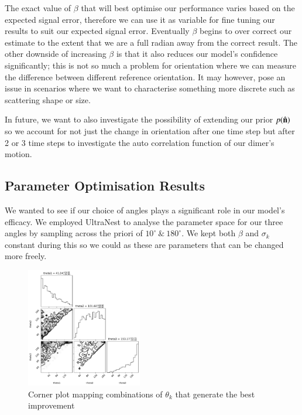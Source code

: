 \documentclass[final,  3p]{elsarticle}
\begin{document}
The exact value of $\beta$ that will best optimise our performance varies based on the expected signal error, therefore we can use it as variable for fine tuning our results to suit our expected signal error. Eventually $\beta$ begins to over correct our estimate to the extent that we are a full radian away from the correct result. The other downside of increasing $\beta$ is that it also reduces our model's confidence significantly; this is not so much a problem for orientation where we can measure the difference between different reference orientation. It may however, pose an issue in scenarios where we want to characterise something more discrete such as scattering shape or size. 

In future, we want to also investigate the possibility of extending our prior $p(\hat{\bf n})$ so we account for not just the change in orientation after one time step but after 2 or 3 time steps to investigate the auto correlation function of our dimer's motion.

\subsection{Parameter Optimisation Results}
\label{sec:ultranest_res}

We wanted to see if our choice of angles plays a significant role in our model's efficacy. We employed UltraNest to analyse the parameter space for our three angles by sampling across the priori of $10^{\circ} \ \& \ 180^{\circ}$.  We kept both $\beta$ and $\sigma_k$ constant during this so we could as these are parameters that can be changed more freely.

\begin{figure}[h]
	\centering
	\includegraphics[width=0.45\textwidth]{./Images/fig8.png}
	\caption{Corner plot mapping combinations of $\theta_k$ that generate the best improvement}
	\label{fig:corner}
\end{figure}
\end{document}
